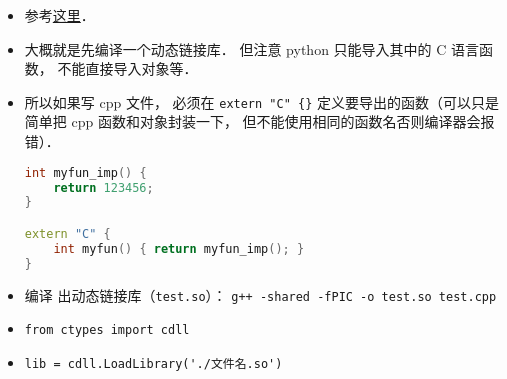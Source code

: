 
\begin{issues}
\issueDraft
\end{issues}

\begin{itemize}
\item 参考\href{https://www.geeksforgeeks.org/how-to-call-c-c-from-python/}{这里}．
\item 大概就是先编译一个动态链接库． 但注意 python 只能导入其中的 C 语言函数， 不能直接导入对象等．
\item 所以如果写 cpp 文件， 必须在 \verb|extern "C" {}| 定义要导出的函数（可以只是简单把 cpp 函数和对象封装一下， 但不能使用相同的函数名否则编译器会报错）．
\begin{lstlisting}[language=cpp, caption=test.cpp]
int myfun_imp() {
	return 123456;
}

extern "C" {
	int myfun() { return myfun_imp(); }
}
\end{lstlisting}
\item 编译 出动态链接库（\verb|test.so|）： \verb|g++ -shared -fPIC -o test.so test.cpp|
\item \verb|from ctypes import cdll|
\item \verb|lib = cdll.LoadLibrary('./文件名.so')|
\end{itemize}
